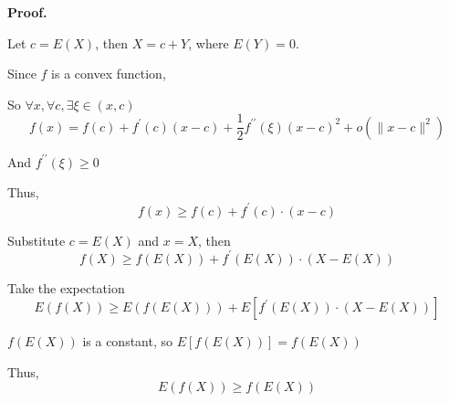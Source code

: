 \documentclass[a4paper, 11pt]{article}
\newenvironment{solution}
    {\textbf{Proof.}}
    {}
\begin{document}
\begin{solution}
	
	Let \( c = E(X) \), then \( X = c + Y \), where \( E(Y) = 0 \).
	
	Since \( f \) is a convex function,
	
	So \( \forall x,\forall c,\exists \xi\in(x,c) \) 
	$$
	f(x)=f(c)+f^\prime(c)(x - c)+\frac{1}{2}f^{\prime\prime}(\xi)(x - c)^2+o(\|x - c\|^2)
	$$
	
	And \( f^{\prime\prime}(\xi)\geq0 \)
	
	Thus, 
	$$
	f(x)\geq f(c)+f^\prime(c)\cdot(x - c)
	$$
	
	Substitute \( c = E(X) \) and \( x = X \), then
	$$
	f(X)\geq f(E(X))+f^\prime(E(X))\cdot(X - E(X))
	$$
	
	Take the expectation
	$$
	E(f(X))\geq E(f(E(X)))+ E\left[f^\prime(E(X))\cdot(X - E(X))\right]
	$$
	
	\( f(E(X)) \) is a constant, so \( E[f(E(X))]=f(E(X)) \)
	
	Thus, 
	$$E(f(X))\geq f(E(X))$$
\end{solution}
\end{document}
